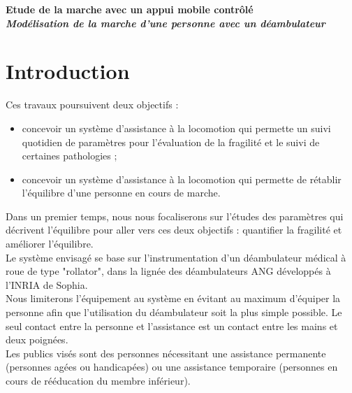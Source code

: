 \documentclass[a4paper, 10pt ]{article}
\begin{document}
\begin{center}
\vspace{0.2cm}
\Large \bf{Etude de la marche avec un appui mobile contrôlé}\\
\textit{\bf{Modélisation de la marche d'une personne avec un déambulateur}}\\
\end{center}

\section{Introduction}

Ces travaux poursuivent deux objectifs : 
\begin{itemize} 
\item concevoir un système d'assistance à la locomotion qui permette un suivi quotidien de paramètres pour l'évaluation de la fragilité et le suivi de certaines pathologies ; 
\item concevoir un système d'assistance à la locomotion qui permette de rétablir l'équilibre d'une personne en cours de marche. 
\end{itemize} 

Dans un premier temps, nous nous focaliserons sur l'études des paramètres qui décrivent l'équilibre pour aller vers ces deux objectifs : quantifier la fragilité et améliorer l'équilibre. \\

Le système envisagé se base sur l'instrumentation d'un déambulateur médical à roue de type "rollator", dans la lignée des déambulateurs ANG développés à l'INRIA de Sophia. \\

Nous limiterons l'équipement au système en évitant au maximum d'équiper la personne afin que l'utilisation du déambulateur soit la plus simple possible. Le seul contact entre la personne et l'assistance est un contact entre les mains et deux poignées. \\%

Les publics visés sont des personnes nécessitant une assistance permanente (personnes agées ou handicapées) ou une assistance temporaire (personnes en cours de rééducation du membre inférieur). \\
\end{document}
